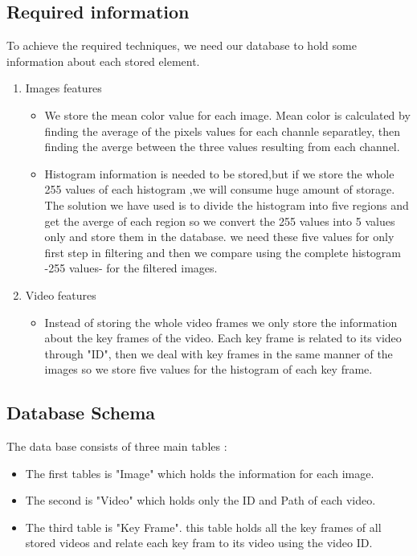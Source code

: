 \subsection{Required information}
To achieve the required techniques, we need our database to hold some information about each stored element.
\begin{enumerate}
    \item Images features
    \begin{itemize}
        \item We store the mean color value for each image. Mean color is calculated by finding the average of the pixels values for each channle separatley,
        then finding the averge between the three values resulting from each channel.        
        \item Histogram information is needed to be stored,but if we store the whole 255 values of each histogram ,we will consume huge amount of storage.
        The solution we have used is to divide the histogram into five regions and get the averge of each region so we convert the 255 values into 5 values only and store them in the database.
        we need these five values for only first step in filtering and then we compare using the complete histogram -255 values- for the filtered images.
    \end{itemize}
    \item Video features
    \begin{itemize}
        \item Instead of storing the whole video frames we only store the information about the key frames of the video. Each key frame is related to its video through
        "ID", then we deal with key frames in the same manner of the images so we store five values for the histogram of each key frame.
    \end{itemize}
\end{enumerate}

\subsection{Database Schema}
The data base consists of three main tables :
\begin{itemize}
    \item The first tables is "Image" which holds the information for each image.        
    \item The second is "Video" which holds only the ID and Path of each video.
    \item The third table is "Key Frame".
    this table holds all the key frames of all stored videos and relate each key fram to its video using the video ID.
\end{itemize}
\vskip 0.2in

